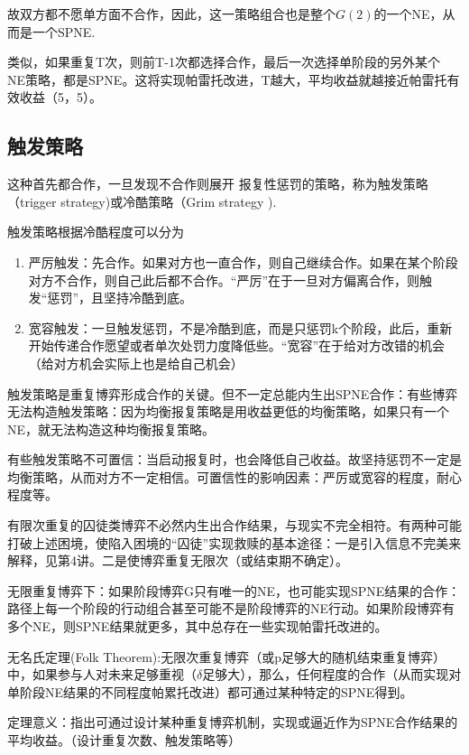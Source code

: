 \documentclass[UTF8,12pt]{ctexart}
\numberwithin{equation}{section} %
\numberwithin{figure}{section}
\numberwithin{table}{section}
\begin{document}
	故双方都不愿单方面不合作，因此，这一策略组合也是整个$G(2)$的一个NE，从而是一个SPNE.
	
	类似，如果重复T次，则前T-1次都选择合作，最后一次选择单阶段的另外某个
	NE策略，都是SPNE。这将实现帕雷托改进，T越大，平均收益就越接近帕雷托有效收益（5，5）。
	
	\subsection{触发策略}
	这种首先都合作，一旦发现不合作则展开
	报复性惩罚的策略，称为触发策略（trigger
	strategy)或冷酷策略（Grim strategy ).
	
	触发策略根据冷酷程度可以分为
	\begin{enumerate}
		\item 严厉触发：先合作。如果对方也一直合作，则自己继续合作。如果在某个阶段对方不合作，则自己此后都不合作。“严厉”在于一旦对方偏离合作，则触发“惩罚”，且坚持冷酷到底。
		
		\item 宽容触发：一旦触发惩罚，不是冷酷到底，而是只惩罚k个阶段，此后，重新开始传递合作愿望或者单次处罚力度降低些。“宽容”在于给对方改错的机会（给对方机会实际上也是给自己机会）
	\end{enumerate}

	触发策略是重复博弈形成合作的关键。但不一定总能内生出SPNE合作：有些博弈无法构造触发策略：因为均衡报复策略是用收益更低的均衡策略，如果只有一个NE，就无法构造这种均衡报复策略。
	
	有些触发策略不可置信：当启动报复时，也会降低自己收益。故坚持惩罚不一定是均衡策略，从而对方不一定相信。可置信性的影响因素：严厉或宽容的程度，耐心程度等。
	
	有限次重复的囚徒类博弈不必然内生出合作结果，与现实不完全相符。有两种可能打破上述困境，使陷入困境的“囚徒”实现救赎的基本途径：一是引入信息不完美来解释，见第4讲。二是使博弈重复无限次（或结束期不确定）。
	
	无限重复博弈下：如果阶段博弈G只有唯一的NE，也可能实现SPNE结果的合作：路径上每一个阶段的行动组合甚至可能不是阶段博弈的NE行动。如果阶段博弈有多个NE，则SPNE结果就更多，其中总存在一些实现帕雷托改进的。
	
	无名氏定理(Folk Theorem):无限次重复博弈（或p足够大的随机结束重复博弈）中，如果参与人对未来足够重视（$\delta$足够大），那么，任何程度的合作（从而实现对单阶段NE结果的不同程度帕累托改进）都可通过某种特定的SPNE得到。

	定理意义：指出可通过设计某种重复博弈机制，实现或逼近作为SPNE合作结果的平均收益。（设计重复次数、触发策略等）
	
\end{document}
